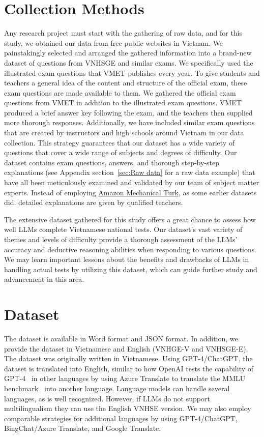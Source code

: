 \documentclass{article}
\begin{document}
{	
	
	\section{Collection Methods}
	\label{sec:collection}
	
	Any research project must start with the gathering of raw data, and for this study, we obtained our data from free public websites in Vietnam. We painstakingly selected and arranged the gathered information into a brand-new dataset of questions from VNHSGE and similar exams. We specifically used the illustrated exam questions that VMET publishes every year. To give students and teachers a general idea of the content and structure of the official exam, these exam questions are made available to them. We gathered the official exam questions from VMET in addition to the illustrated exam questions. VMET produced a brief answer key following the exam, and the teachers then supplied more thorough responses. Additionally, we have included similar exam questions that are created by instructors and high schools around Vietnam in our data collection. This strategy guarantees that our dataset has a wide variety of questions that cover a wide range of subjects and degrees of difficulty. Our dataset contains exam questions, answers, and thorough step-by-step explanations (see Appendix section~\ref{sec:Raw data} for a raw data example) that have all been meticulously examined and validated by our team of subject matter experts. Instead of employing \href{https://www.mturk.com/}{Amazon Mechanical Turk}, as some earlier datasets did, detailed explanations are given by qualified teachers.
	
	The extensive dataset gathered for this study offers a great chance to assess how well LLMs complete Vietnamese national tests. Our dataset's vast variety of themes and levels of difficulty provide a thorough assessment of the LLMs' accuracy and deductive reasoning abilities when responding to various questions. We may learn important lessons about the benefits and drawbacks of LLMs in handling actual tests by utilizing this dataset, which can guide further study and advancement in this area.
	
	\section{Dataset}
	\label{sec:dataset}
	
	The dataset is available in Word format and JSON format. In addition, we provide the dataset in Vietnamese and English (VNHGE-V and VNHSGE-E). The dataset was originally written in Vietnamese. Using GPT-4/ChatGPT, the dataset is translated into English, similar to how OpenAI tests the capability of GPT-4~\cite{OpenAI_gpt_4_report} in other languages by using Azure Translate to translate the MMLU benchmark~\cite{hendrycks2020measuring} into another language. Language models can handle several languages, as is well recognized. However, if LLMs do not support multilingualism they can use the English VNHSE version. We may also employ comparable strategies for additional languages by using GPT-4/ChatGPT, BingChat/Azure Translate, and Google Translate.
	
}
\end{document}
